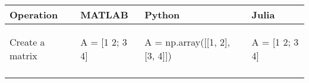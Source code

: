 \documentclass[10pt, landscape]{article}
\newenvironment{Shaded}{}{}
\newcommand{\DecValTok}[1]{\textcolor[rgb]{0.25,0.63,0.44}{{#1}}}
\newcommand{\FloatTok}[1]{\textcolor[rgb]{0.25,0.63,0.44}{{#1}}}
\newcommand{\OperatorTok}[1]{\textcolor[rgb]{0.40,0.40,0.40}{{#1}}}
\newcommand{\NormalTok}[1]{{#1}}
\begin{document}
\begin{multicols*}{2}
\begin{table}[ht]
\begin{tabular}[ ]{@{}llll@{}}
\toprule
\begin{minipage}[b]{0.24\columnwidth}\raggedright\strut
Operation\strut
\end{minipage} & \begin{minipage}[b]{0.20\columnwidth}\raggedright\strut
MATLAB\strut
\end{minipage} & \begin{minipage}[b]{0.25\columnwidth}\raggedright\strut
Python\strut
\end{minipage} & \begin{minipage}[b]{0.20\columnwidth}\raggedright\strut
Julia\strut
\end{minipage}\tabularnewline
\midrule
\begin{minipage}[t]{0.24\columnwidth}\raggedright\strut
Create a matrix\strut
\end{minipage} & \begin{minipage}[t]{0.20\columnwidth}\raggedright\strut
\begin{Shaded}
\begin{Highlighting}[]
\NormalTok{A = [}\FloatTok{1} \FloatTok{2}\NormalTok{; }\FloatTok{3} \FloatTok{4}\NormalTok{]}
\end{Highlighting}
\end{Shaded}
\strut
\end{minipage} & \begin{minipage}[t]{0.25\columnwidth}\raggedright\strut
\begin{Shaded}
\begin{Highlighting}[]
\NormalTok{A }\OperatorTok{=} \NormalTok{np.array([[}\DecValTok{1}\NormalTok{, }\DecValTok{2}\NormalTok{], [}\DecValTok{3}\NormalTok{, }\DecValTok{4}\NormalTok{]])}
\end{Highlighting}
\end{Shaded}
\strut
\end{minipage} & \begin{minipage}[t]{0.20\columnwidth}\raggedright\strut
\begin{Shaded}
\begin{Highlighting}[]
\NormalTok{A = [}\FloatTok{1} \FloatTok{2}\NormalTok{; }\FloatTok{3} \FloatTok{4}\NormalTok{]}
\end{Highlighting}
\end{Shaded}
\strut
\end{minipage}\tabularnewline
\begin{minipage}[t]{0.24\columnwidth}\raggedright\strut

\end{minipage}
\end{tabular}
\end{table}
\end{multicols*}
\end{document}
